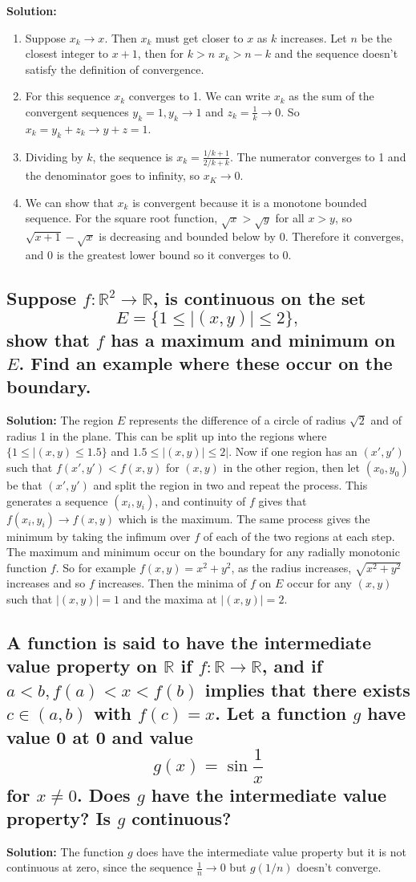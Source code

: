 \documentclass{article}
\newcommand{\exercise}[1]{\subsection{\normalfont #1}}
\newcommand{\solution}{\indent\indent \textbf{Solution: }}
\begin{document}
\solution
\begin{enumerate}
\item Suppose $x_k\to x$. Then $x_k$ must get closer to $x$ as $k$ increases. Let $n$ be the closest integer to $x+1$, then for $k>n$ $x_k>n-k$ and the sequence doesn't satisfy the definition of convergence. 
 \item For this sequence $x_k$ converges to 1. We can write $x_k$ as the sum of the convergent sequences $y_k= 1, y_k\to 1$ and $z_k = \frac{1}{k} \to 0$. So $x_k = y_k + z_k \to y + z = 1$.
\item Dividing by $k$, the sequence is $x_k = \frac{1/k + 1}{2/k + k}$. The numerator converges to 1 and the denominator goes to infinity, so $x_K\to 0$. 
\item We can show that $x_k$ is convergent because it is a monotone bounded sequence. For the square root function, $\sqrt{x} > \sqrt{y}$ for all $x>y$, so $\sqrt{x+1}-\sqrt{x}$ is decreasing and bounded below by 0. Therefore it converges, and 0 is the greatest lower bound so it converges to 0. %
 \end{enumerate}
\exercise{Suppose $f\colon \mathbb{R}^2 \to \mathbb{R}$, is continuous on the set $$E = \{1 \leq \vert (x,y) \vert \leq 2 \},$$ show that $f$ has a maximum and minimum on $E$. Find an example where these occur on the boundary.} %
\solution The region $E$ represents the difference of a circle of radius $\sqrt 2$ and of radius 1 in the plane. This can be split up into the regions where $\{1\leq |(x,y) \leq 1.5\}$ and $1.5 \leq |(x,y)| \leq 2|$. Now if one region has an $(x',y')$ such that $f(x', y') < f(x,y)$ for $(x,y)$ in the  other region, then let $(x_0,y_0)$ be that $(x', y')$ and split the region in two and repeat the process. This generates a sequence $(x_i,y_i)$, and continuity of $f$ gives that $f(x_i,y_i) \to f(x,y)$ which is the maximum. The same process gives the minimum by taking the infimum over $f$ of each of the two regions at each step. \\
The maximum and minimum occur on the boundary for any radially monotonic function $f$. So for example $f(x,y) = x^2 + y^2$, as the radius increases, $\sqrt{x^2 + y^2}$ increases and so $f$ increases. Then the minima of $f$ on $E$ occur for any $(x,y)$ such that $|(x,y)| = 1$ and the maxima at $|(x,y)| = 2$.  

\exercise{A function is said to have the intermediate value property on $\mathbb{R}$ if $f\colon \mathbb{R}\to\mathbb{R}$, and if $a< b, f(a) < x < f(b)$ implies that there exists $c\in (a,b)$ with $f(c) = x$. Let a function $g$ have value 0 at 0 and value $$g(x) = \sin{\frac{1}{x}}$$ for $x\neq 0$.  Does $g$ have the intermediate value property? Is $g$ continuous?}
\solution The function $g$ does have the intermediate value property but it is not continuous at zero, since the sequence $\frac{1}{n}\to 0$ but $g(1/n)$ doesn't converge. 
\end{document}
